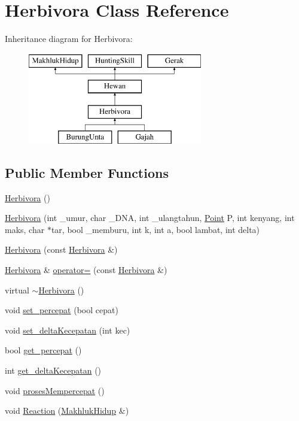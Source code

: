 \hypertarget{class_herbivora}{}\section{Herbivora Class Reference}
\label{class_herbivora}
Inheritance diagram for Herbivora\+:\begin{figure}[H]
\begin{center}
\leavevmode
\includegraphics[height=4.000000cm]{class_herbivora}
\end{center}
\end{figure}
\subsection*{Public Member Functions}
\begin{DoxyCompactItemize}
\item 
\hyperlink{class_herbivora_ae8610577ee87a166177be431b989b2c0}{Herbivora} ()
\item 
\hyperlink{class_herbivora_a226a2efa9d41653fab8efa87608b583d}{Herbivora} (int \+\_\+umur, char \+\_\+\+D\+NA, int \+\_\+ulangtahun, \hyperlink{class_point}{Point} P, int kenyang, int maks, char $\ast$tar, bool \+\_\+memburu, int k, int a, bool lambat, int delta)
\item 
\hyperlink{class_herbivora_a754ef435d7a6a6bffe727e809e5f211b}{Herbivora} (const \hyperlink{class_herbivora}{Herbivora} \&)
\item 
\hyperlink{class_herbivora}{Herbivora} \& \hyperlink{class_herbivora_a045acf6e3df5988ca9e93384e5450876}{operator=} (const \hyperlink{class_herbivora}{Herbivora} \&)
\item 
virtual \hyperlink{class_herbivora_aa0dcb5298f0e99b7bcb1a335bdffa393}{$\sim$\+Herbivora} ()
\item 
void \hyperlink{class_herbivora_a1b460ec339813b44bd368412fd3b2c76}{set\+\_\+percepat} (bool cepat)
\item 
void \hyperlink{class_herbivora_a8cf1ea08fd33527b16e2092935080a3d}{set\+\_\+delta\+Kecepatan} (int kec)
\item 
bool \hyperlink{class_herbivora_acf023d22ffa5accee04a503ded9952a6}{get\+\_\+percepat} ()
\item 
int \hyperlink{class_herbivora_a60f1095412a18804afd582dbba89415b}{get\+\_\+delta\+Kecepatan} ()
\item 
void \hyperlink{class_herbivora_a8e90ec668b96032f698bf99569481f62}{proses\+Mempercepat} ()
\item 
void \hyperlink{class_herbivora_a649b50a3d1e6f8d290baf1977a6ce88a}{Reaction} (\hyperlink{class_makhluk_hidup}{Makhluk\+Hidup} \&)
\end{DoxyCompactItemize}


